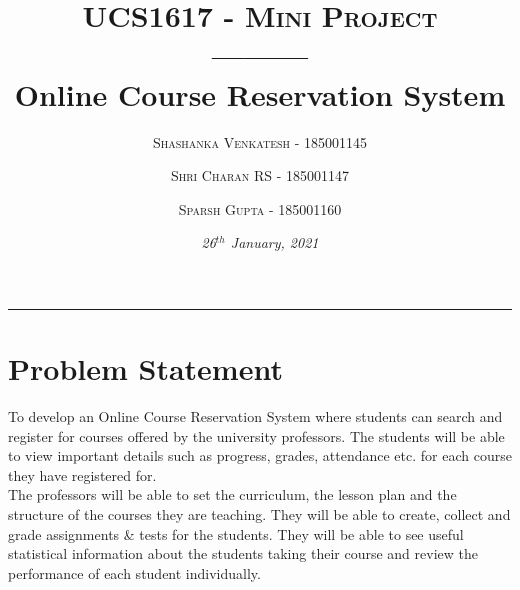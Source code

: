 \documentclass[12pt, a4]{article}
\title{{\large \textsc{UCS1617 - Mini Project}}\\---------\\\textbf{Online Course Reservation System}}
\author {
  \textsc{Shashanka Venkatesh - 185001145}
  \and
  \textsc{Shri Charan RS - 185001147}
  \and
  \textsc{Sparsh Gupta - 185001160}
}
\date{\normalsize{\textsl{26$^{th}$ January, 2021}}}
\begin{document}
\maketitle
\hrule

\section*{Problem Statement}
To develop an Online Course Reservation System where students can search and
register for courses offered by the university professors. The students will be able to view important details such as progress, grades, attendance etc. for each course they have registered for.\\
The professors will be able to set the curriculum, the lesson plan and the structure of the courses they are teaching. They will be able to create, collect and grade assignments \& tests for the students. They will be able to see useful statistical information about the students taking their course and review the performance of each student individually.
\end{document}
